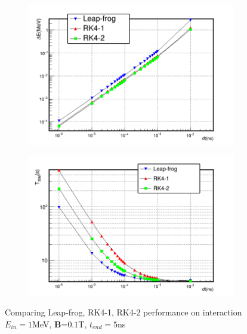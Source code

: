 \documentclass{book}
\begin{document}
\begin{figure}[H]
    \captionsetup[subfigure]{justification=centering}
    \captionsetup{justification=centering}
    \centering
    \begin{subfigure}{0.9\textwidth}
        \centering
        \includegraphics[width=\linewidth]{../../../figures/analiz/lf_rk1_rk2_dt-E_3.png}
    \end{subfigure}
    
    \begin{subfigure}{0.9\textwidth}
        \centering
        \includegraphics[width=\linewidth]{../../../figures/analiz/lf_rk1_rk2_dt-Tsim_3.png}
    \end{subfigure}
    \caption{Comparing Leap-frog, RK4-1, RK4-2 performance on \eB interaction\\ $E_{in}=1$MeV, \textbf{B}=$0.1$T, $t_{end}=5$ns}
    \label{fig:lf_rk1_rk2_comparison}
\end{figure}
\end{document}
